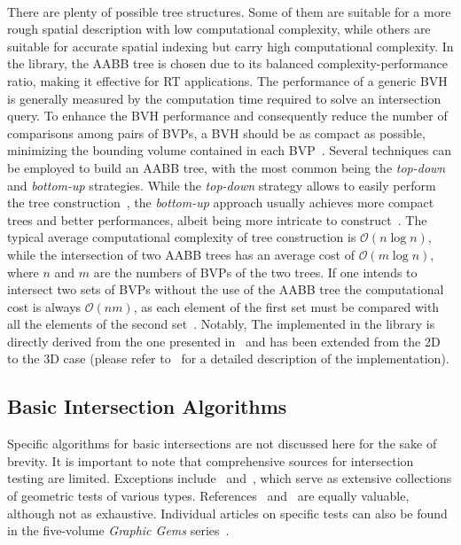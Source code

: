 \paragraph{\AabbTree{}}
There are plenty of possible tree structures. Some of them are suitable for a more rough spatial description with low computational complexity, while others are suitable for accurate spatial indexing but carry high computational complexity. In the \Acme{} library, the \ac{AABB} tree is chosen due to its balanced complexity-performance ratio, making it effective for \ac{RT} applications. The performance of a generic \ac{BVH} is generally measured by the computation time required to solve an intersection query. To enhance the \ac{BVH} performance and consequently reduce the number of comparisons among pairs of \acp{BVP}, a \ac{BVH} should be as compact as possible, minimizing the bounding volume contained in each \ac{BVP}~\cite{asyrani2012bounding, eloe2014dual}. Several techniques can be employed to build an \ac{AABB} tree, with the most common being the \emph{top-down} and \emph{bottom-up} strategies. While the \emph{top-down} strategy allows to easily perform the tree construction~\cite{eloe2014dual, ericson2004realtime, asyrani2012bounding}, the \emph{bottom-up} approach usually achieves more compact trees and better performances, albeit being more intricate to construct~\cite{omohundro1989five, asyrani2012bounding}. The typical average computational complexity of tree construction is $\mathcal{O}(n\log{n})$, while the intersection of two \ac{AABB} trees has an average cost of $\mathcal{O}(m\log{n})$, where $n$ and $m$ are the numbers of \acp{BVP} of the two trees. If one intends to intersect two sets of \acp{BVP} without the use of the \ac{AABB} tree the computational cost is always $\mathcal{O}(nm)$, as each element of the first set must be compared with all the elements of the second set~\cite{xing2010efficient}. Notably, The \AabbTree{} implemented in the \Acme{} library is directly derived from the one presented in~\cite{frego2019pointcoloud, bertolazzi2020efficient} and has been extended from the 2D to the 3D case (please refer to~\cite{stocco2021acme} for a detailed description of the \AabbTree{} implementation).

\subsection{Basic Intersection Algorithms}

Specific algorithms for basic intersections are not discussed here for the sake of brevity. It is important to note that comprehensive sources for intersection testing are limited. Exceptions include~\cite{schneider2002geometric} and~\cite{eberly2020robust}, which serve as extensive collections of geometric tests of various types. References~\cite{ericson2004realtime} and~\cite{vandenbergen2003collision} are equally valuable, although not as exhaustive. Individual articles on specific tests can also be found in the five-volume \emph{Graphic Gems} series~\cite{glassner1990graphics, arvo1991graphics, kirk1992graphics, heckbert1994graphics, paeth1995graphics}.

